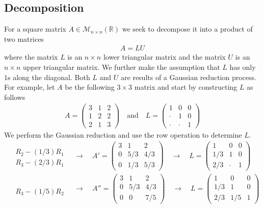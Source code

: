 \subsection*{Decomposition}
For a square matrix $A \in \mathcal{M}_{n\times n} (\mathbb{R})$ we seek to decompose it into a product of two matrices
\begin{align*}
A = L U
\end{align*}
where the matrix $L$ is an $n\times n$ lower triangular matrix and the matrix $U$ is an $n\times n$ upper triangular matrix. We further make the assumption that $L$ has only $1$s along the diagonal. Both $L$ and $U$ are results of a Gaussian reduction process. For example, let $A$ be the following $3\times 3$ matrix and start by constructing $L$ as follows
\begin{align*}
A = 
\begin{pmatrix}
3 & 1 & 2 \\
1 & 2 & 2 \\
2 & 1 & 3
\end{pmatrix}
\quad\text{and}\quad
L = 
\begin{pmatrix}
1     & 0     & 0 \\
\cdot & 1     & 0 \\
\cdot & \cdot & 1
\end{pmatrix}
\end{align*}
We perform the Gaussian reduction and use the row operation to determine $L$. 
\begin{align*}
&
\begin{matrix}
  \\
R_2 - \left( 1/3 \right)R_1  \\
R_3 - \left( 2/3 \right)R_1 
\end{matrix}
\quad\to\quad
A' = 
\begin{pmatrix}
3 & 1 & 2 \\
0 & 5/3 & 4/3 \\
0 & 1/3 & 5/3 
\end{pmatrix}
\quad\to\quad
L = 
\begin{pmatrix}
1   & 0     & 0 \\
1/3 & 1     & 0 \\
2/3 & \cdot & 1 
\end{pmatrix}
\\
&
\begin{matrix}
  \\
  \\
R_3 - \left( 1/5 \right)R_2 
\end{matrix}
\quad\to\quad
A'' = 
\begin{pmatrix}
3 & 1 & 2 \\
0 & 5/3 & 4/3 \\
0 & 0 & 7/5 
\end{pmatrix}
\quad\to\quad
L = 
\begin{pmatrix}
1   & 0     & 0 \\
1/3 & 1     & 0 \\
2/3 & 1/5 & 1 
\end{pmatrix}
\end{align*}
